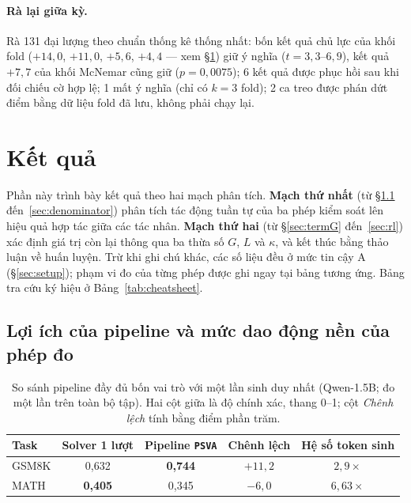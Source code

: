 \documentclass[11pt,a4paper]{article}
\begin{document}
\paragraph{Rà lại giữa kỳ.} Rà 131 đại lượng theo chuẩn thống kê thống nhất: bốn kết quả chủ
lực của khối fold ($+14{,}0$, $+11{,}0$, $+5{,}6$, $+4{,}4$ --- xem \S\ref{sec:results}) giữ ý
nghĩa ($t=3{,}3$--$6{,}9$), kết quả $+7{,}7$ của khối McNemar cũng giữ ($p=0{,}0075$); 6 kết
quả được phục hồi sau khi đối chiếu cờ hợp lệ; 1 mất ý nghĩa (chỉ có $k{=}3$ fold); 2 ca treo
được phán dứt điểm bằng dữ liệu fold đã lưu, không phải chạy lại.

\section{Kết quả}\label{sec:results}

Phần này trình bày kết quả theo hai mạch phân tích. \textbf{Mạch thứ nhất} (từ \S\ref{sec:start} đến~\ref{sec:denominator}) phân tích tác động tuần tự của ba phép kiểm soát lên hiệu quả hợp tác giữa các tác nhân. \textbf{Mạch thứ hai} (từ \S\ref{sec:termG} đến~\ref{sec:rl}) xác định giá trị còn lại thông qua ba thừa số $G$, $L$ và $\kappa$, và kết thúc bằng thảo luận về huấn luyện. Trừ khi ghi chú khác, các số liệu đều ở mức tin cậy A (\S\ref{sec:setup}); phạm vi đo của từng phép được ghi ngay tại bảng tương ứng. Bảng tra cứu ký hiệu ở Bảng~\ref{tab:cheatsheet}.

\subsection{Lợi ích của pipeline và mức dao động nền của phép đo}\label{sec:start}

\begin{table}[h]\centering\small
\begin{tabular}{@{}l c c c c@{}}
\toprule
Task & Solver 1 lượt & Pipeline \texttt{PSVA} & Chênh lệch & Hệ số token sinh\\
\midrule
GSM8K & 0,632 & \textbf{0,744} & $+11{,}2$ & $2{,}9\times$\\
MATH  & \textbf{0,405} & 0,345 & $-6{,}0$ & $6{,}63\times$\\
\bottomrule
\end{tabular}
\caption{So sánh pipeline đầy đủ bốn vai trò với một lần sinh duy nhất (Qwen-1.5B; đo một lần trên
toàn bộ tập). Hai cột giữa là độ chính xác, thang 0--1; cột \emph{Chênh lệch} tính bằng điểm phần trăm.}
\label{tab:pipeline}
\end{table}
\end{document}
